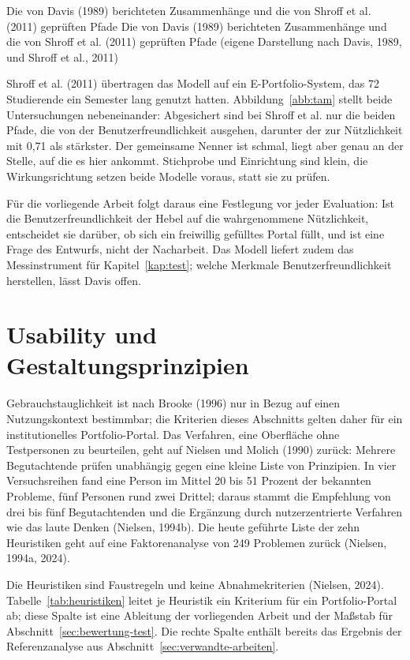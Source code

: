 %
{Die von Davis (1989) berichteten Zusammenhänge und die von Shroff et al. (2011) geprüften Pfade}%
{Die von Davis (1989) berichteten Zusammenhänge und die von Shroff et al. (2011) geprüften Pfade (eigene Darstellung nach Davis, 1989, und Shroff et al., 2011)}

Shroff et al. (2011) übertragen das Modell auf ein E-Portfolio-System, das 72 Studierende ein Semester lang genutzt hatten. Abbildung~\ref{abb:tam} stellt beide Untersuchungen nebeneinander: Abgesichert sind bei Shroff et al. nur die beiden Pfade, die von der Benutzerfreundlichkeit ausgehen, darunter der zur Nützlichkeit mit 0,71 als stärkster. Der gemeinsame Nenner ist schmal, liegt aber genau an der Stelle, auf die es hier ankommt. Stichprobe und Einrichtung sind klein, die Wirkungsrichtung setzen beide Modelle voraus, statt sie zu prüfen.

Für die vorliegende Arbeit folgt daraus eine Festlegung vor jeder Evaluation: Ist die Benutzerfreundlichkeit der Hebel auf die wahrgenommene Nützlichkeit, entscheidet sie darüber, ob sich ein freiwillig gefülltes Portal füllt, und ist eine Frage des Entwurfs, nicht der Nacharbeit. Das Modell liefert zudem das Messinstrument für Kapitel~\ref{kap:test}; welche Merkmale Benutzerfreundlichkeit herstellen, lässt Davis offen.

\section{Usability und Gestaltungsprinzipien}
\label{sec:usability}

Gebrauchstauglichkeit ist nach Brooke (1996) nur in Bezug auf einen Nutzungskontext bestimmbar; die Kriterien dieses Abschnitts gelten daher für ein institutionelles Portfolio-Portal. Das Verfahren, eine Oberfläche ohne Testpersonen zu beurteilen, geht auf Nielsen und Molich (1990) zurück: Mehrere Begutachtende prüfen unabhängig gegen eine kleine Liste von Prinzipien. In vier Versuchsreihen fand eine Person im Mittel 20 bis 51 Prozent der bekannten Probleme, fünf Personen rund zwei Drittel; daraus stammt die Empfehlung von drei bis fünf Begutachtenden und die Ergänzung durch nutzerzentrierte Verfahren wie das laute Denken (Nielsen, 1994b). Die heute geführte Liste der zehn Heuristiken geht auf eine Faktorenanalyse von 249 Problemen zurück (Nielsen, 1994a, 2024).

Die Heuristiken sind Faustregeln und keine Abnahmekriterien (Nielsen, 2024). Tabelle~\ref{tab:heuristiken} leitet je Heuristik ein Kriterium für ein Portfolio-Portal ab; diese Spalte ist eine Ableitung der vorliegenden Arbeit und der Maßstab für Abschnitt~\ref{sec:bewertung-test}. Die rechte Spalte enthält bereits das Ergebnis der Referenzanalyse aus Abschnitt~\ref{sec:verwandte-arbeiten}.

